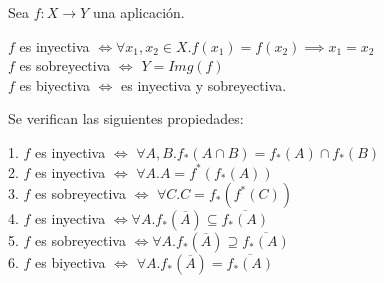 \begin{definition}
	Sea $f:X \to Y$ una aplicación. 
	
	$f$ es inyectiva $\iff \forall x_1,x_2 \in X. f(x_1) = f(x_2) \implies x_1 = x_2$\\
	$f$ es sobreyectiva $\iff$ $Y = Img(f)$\\
	$f$ es biyectiva $\iff$ es inyectiva y sobreyectiva. 
\end{definition}

\begin{exercise}
	Se verifican las siguientes propiedades:
	
	1. $f$ es inyectiva $\iff$ $\forall A,B. f_*(A \cap B) = f_*(A) \cap f_*(B)$\\
	2. $f$ es inyectiva $\iff$ $\forall A. A= f^*(f_*(A))$\\
	3. $f$ es sobreyectiva $\iff$ $\forall C. C = f_*(f^*(C))$ \\
	4. $f$ es inyectiva $\iff  \forall A.f_*(\overline{A}) \subseteq \overline{f_*(A)}$ \\
	5. $f$ es sobreyectiva $\iff \forall A. f_*(\overline{A}) \supseteq \overline{f_*(A)}$ \\
	6. $f$ es biyectiva $\iff$ $\forall A. f_*(\overline{A}) = \overline{f_*(A)}$
\end{exercise}
